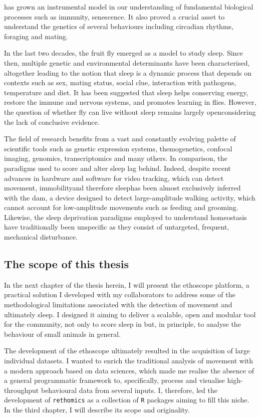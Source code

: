 \droso{} has grown an instrumental model in  our understanding of fundamental biological processes such as immunity, senescence. 
It also proved a crucial asset to understand the genetics of several 
behaviours including circadian rhythms, foraging and mating.

In the last two decades, the fruit fly emerged as a model to study sleep.
Since then, multiple genetic and environmental determinants have been characterised,
altogether leading to the notion that sleep is a dynamic process that depends on contexts such as
sex, mating status, social clue, interaction with pathogens, temperature and diet.
It has been suggested that sleep helps conserving energy, restore the immune and nervous systems, and promotes learning in flies. 
However, the question of whether fly can live without sleep remains largely open\emd{}considering the lack of conclusive evidence.


The field of \droso{} research benefits from a vast and constantly evolving palette of scientific tools such as genetic expression systems, themogenetics, confocal imaging, genomics, transcriptomics and many others.
In comparison, the paradigms used to score and alter sleep lag behind.
Indeed, despite recent advances in hardware and software for video tracking, which can 
detect movement, immobility\emd{}and therefore sleep\emd{}has been almost exclusively inferred with the \gls{dam}, a device designed to detect large-amplitude walking activity, which cannot account for low-amplitude movements such as feeding and grooming.
Likewise, the sleep deprivation paradigms employed to understand homeostasis have traditionally been unspecific as they consist of untargeted, frequent, mechanical disturbance.

\subsection{The scope of this thesis}

In the next chapter of the thesis herein, I will present the ethoscope platform, a practical solution I developed with my collaborators to address some of the methodological limitations associated with the detection of movement and ultimately sleep. I designed it aiming to deliver a scalable, open and modular tool for the community, not only to score sleep in \droso{} but, in principle, to analyse the behaviour of small animals in general.


The development of the ethoscope ultimately resulted in the acquisition of
large individual datasets.
I wanted to enrich the traditional analysis of movement with a modern approach based on data sciences, which made me realise the absence of a general programmatic framework
to, specifically, process and visualise high-throughput behavioural data from several inputs. 
I, therefore, led the development of \texttt{rethomics} as a collection of \texttt{R} packages aiming to fill this niche. 
In the third chapter, I will describe its scope and originality.


